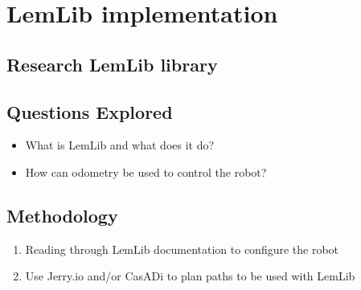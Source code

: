 \section*{LemLib implementation}

\subsection*{Research LemLib library}

\subsection*{Questions Explored}
\begin{itemize}
    \item What is LemLib and what does it do?
    \item How can odometry be used to control the robot?
\end{itemize}

\subsection*{Methodology}
\begin{enumerate}
    \item Reading through LemLib documentation to configure the robot
    \item Use Jerry.io and/or CasADi to plan paths to be used with LemLib
\end{enumerate}

